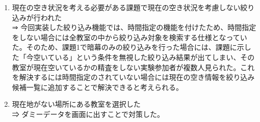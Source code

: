 \documentclass[12pt,a4paper,dvipdf]{jsarticle}
\begin{document}
\begin{enumerate}
    \item 現在の空き状況を考える必要がある課題で現在の空き状況を考慮しない絞り込みが行われた\\
          ⇒ 今回実装した絞り込み機能では、時間指定の機能を付けたため、時間指定をしない場合には全教室の中から絞り込み対象を検索する仕様となっていた。そのため、課題1で暗幕のみの絞り込みを行った場合には、課題に示した「今空いている」という条件を無視した絞り込み結果が出てしまい、その教室が現在空いているかの精査をしない実験参加者が複数人見られた。これを解決するには時間指定のされていない場合には現在の空き情報を絞り込み候補一覧に追加することで解決できると考えられる。
    \item 現在地がない場所にある教室を選択した\\
          ⇒ ダミーデータを画面に出すことで対策した。
\end{enumerate}
\end{document}
